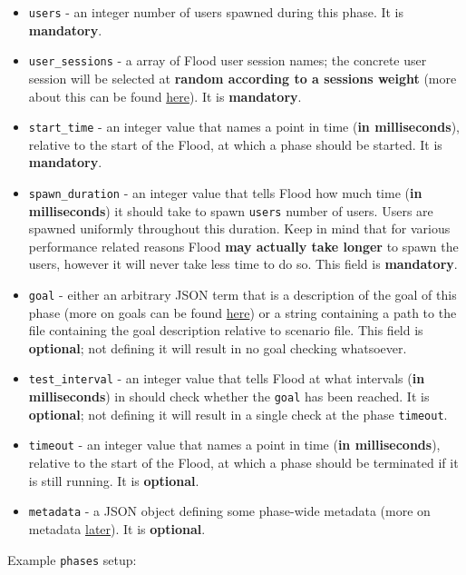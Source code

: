 \documentclass[a4paper]{article}
\begin{document}
\begin{itemize}
\item \texttt{users} - an integer number of users spawned during this phase. It is \textbf{mandatory}.
\item \texttt{user\_sessions} - a array of Flood user session names; the concrete user session will be selected at \textbf{random according to a sessions weight} (more about this can be found \hyperref[sec-2-2]{here}). It is \textbf{mandatory}.
\item \texttt{start\_time} - an integer value that names a point in time (\textbf{in milliseconds}), relative to the start of the Flood, at which a phase should be started. It is \textbf{mandatory}.
\item \texttt{spawn\_duration} - an integer value that tells Flood how much time (\textbf{in milliseconds}) it should take to spawn \texttt{users} number of users. Users are spawned uniformly throughout this duration. Keep in mind that for various performance related reasons Flood \textbf{may actually take longer} to spawn the users, however it will never take less time to do so. This field is \textbf{mandatory}.
\item \texttt{goal} - either an arbitrary JSON term that is a description of the goal of this phase (more on goals can be found \hyperref[sec-2-3]{here}) or a string containing a path to the file containing the goal description relative to scenario file. This field is \textbf{optional}; not defining it will result in no goal checking whatsoever.
\item \texttt{test\_interval} - an integer value that tells Flood at what intervals (\textbf{in milliseconds}) in should check whether the \texttt{goal} has been reached. It is \textbf{optional}; not defining it will result in a single check at the phase \texttt{timeout}.
\item \texttt{timeout} - an integer value that names a point in time (\textbf{in milliseconds}), relative to the start of the Flood, at which a phase should be terminated if it is still running. It is \textbf{optional}.
\item \texttt{metadata} - a JSON object defining some phase-wide metadata (more on metadata \hyperref[sec-3-6]{later}). It is \textbf{optional}.
\end{itemize}

\noindent
Example \texttt{phases} setup:
\end{document}
